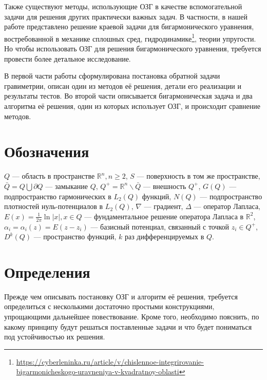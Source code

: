 \documentclass[a4paper, 12pt]{article}
\newcommand{\R}[1]{\mathbb{R}^#1}
\begin{document}
Также существуют методы, использующие ОЗГ в качестве вспомогательной задачи для решения других практически важных задач.
В частности, в нашей работе представлено решение краевой задачи для бигармонического уравнения, востребованной в механике сплошных сред, гидродинамике\footnote{\url{https://cyberleninka.ru/article/v/chislennoe-integrirovanie-bigarmonicheskogo-uravneniya-v-kvadratnoy-oblasti}},
теории упругости. Но чтобы использовать ОЗГ для решения бигармонического уравнения, требуется провести более детальное исследование.

В первой части работы сформулирована постановка обратной задачи гравиметрии, описан один из методов её решения,
детали его реализации и результаты тестов.
Во второй части описывается бигармоническая задача и два алгоритма её решения, один из которых использует ОЗГ, и происходит сравнение методов.

\section*{Обозначения}
$Q$ --- область в пространстве $\mathbb{R}^n, n\geq 2$, $S$ --- поверхность в том же пространстве,
$\bar Q = Q \bigcup \partial Q$ --- замыкание $Q$,
$Q^+= \R{n}\backslash \bar Q$ --- внешность $Q^+$,
$G(Q)$ --- подпространство гармонических в $L_2(Q)$ функций,
$N(Q)$ --- подпространство плотностей нуль-потенциалов в $L_2(Q)$,
$\nabla$ --- градиент,
$\Delta$ --- оператор Лапласа,
$E(x)= \frac{1}{2\pi}  \ln |x|, x \in Q$ --- фундаментальное решение оператора Лапласа в $\R{2}$,
$\alpha_i=\alpha_i(z)=E(z-z_i)$ --- базисный потенциал, связанный с точкой $z_i \in Q^+$,
$D^k(Q)$ --- пространство функций, $k$ раз дифференцируемых в $Q$.

\section{Определения}
Прежде чем описывать постановку ОЗГ и алгоритм её решения,
требуется определиться с несколькими достаточно простыми конструкциями,
упрощающими дальнейшее повествование.
Кроме того, необходимо пояснить, по какому принципу будут решаться поставленные задачи и что будет пониматься под устойчивостью их решения.
\end{document}
